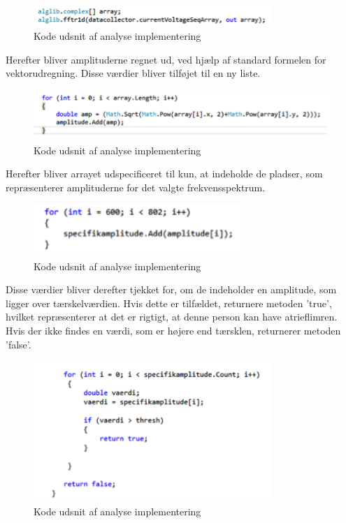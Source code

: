 \begin{figure}[H]
	\centering
	\includegraphics[width=0.8\textwidth]{Figurer/Snip20150525_41}
	\caption{Kode udsnit af analyse implementering}
\end{figure}

Herefter bliver amplituderne regnet ud, ved hjælp af standard formelen for vektorudregning. Disse værdier bliver tilføjet til en ny liste. 

\begin{figure}[H]
	\centering
	\includegraphics[width=1\textwidth]{Figurer/Snip20150525_43}
	\caption{Kode udsnit af analyse implementering}
\end{figure}

Herefter bliver arrayet udspecificeret til kun, at indeholde de pladser, som repræsenterer amplituderne for det valgte frekvensspektrum. 

\begin{figure}[H]
	\centering
	\includegraphics[width=0.7\textwidth]{Figurer/Snip20150525_44}
	\caption{Kode udsnit af analyse implementering}
\end{figure}

Disse værdier bliver derefter tjekket for, om de indeholder en amplitude, som ligger over tærskelværdien. Hvis dette er tilfældet, returnere metoden ’true’, hvilket repræsenterer at det er rigtigt, at denne person kan have atrieflimren. Hvis der ikke findes en værdi, som er højere end tærsklen, returnerer metoden ’false’. 

\begin{figure}[H]
	\centering
	\includegraphics[width=0.8\textwidth]{Figurer/Snip20150525_47}
	\caption{Kode udsnit af analyse implementering}
\end{figure}

